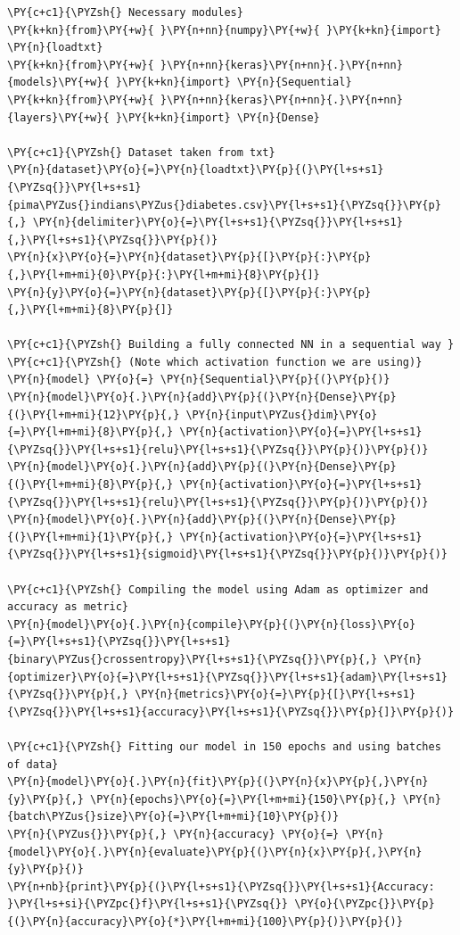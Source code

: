 \begin{Verbatim}[label=\makebox{\url{https://github.com/lucabaldini/cmepda/tree/master/slides/latex/snippets/pima_classifier.py}},commandchars=\\\{\}]
\PY{c+c1}{\PYZsh{} Necessary modules}
\PY{k+kn}{from}\PY{+w}{ }\PY{n+nn}{numpy}\PY{+w}{ }\PY{k+kn}{import} \PY{n}{loadtxt}
\PY{k+kn}{from}\PY{+w}{ }\PY{n+nn}{keras}\PY{n+nn}{.}\PY{n+nn}{models}\PY{+w}{ }\PY{k+kn}{import} \PY{n}{Sequential}
\PY{k+kn}{from}\PY{+w}{ }\PY{n+nn}{keras}\PY{n+nn}{.}\PY{n+nn}{layers}\PY{+w}{ }\PY{k+kn}{import} \PY{n}{Dense}

\PY{c+c1}{\PYZsh{} Dataset taken from txt}
\PY{n}{dataset}\PY{o}{=}\PY{n}{loadtxt}\PY{p}{(}\PY{l+s+s1}{\PYZsq{}}\PY{l+s+s1}{pima\PYZus{}indians\PYZus{}diabetes.csv}\PY{l+s+s1}{\PYZsq{}}\PY{p}{,} \PY{n}{delimiter}\PY{o}{=}\PY{l+s+s1}{\PYZsq{}}\PY{l+s+s1}{,}\PY{l+s+s1}{\PYZsq{}}\PY{p}{)}
\PY{n}{x}\PY{o}{=}\PY{n}{dataset}\PY{p}{[}\PY{p}{:}\PY{p}{,}\PY{l+m+mi}{0}\PY{p}{:}\PY{l+m+mi}{8}\PY{p}{]}
\PY{n}{y}\PY{o}{=}\PY{n}{dataset}\PY{p}{[}\PY{p}{:}\PY{p}{,}\PY{l+m+mi}{8}\PY{p}{]}

\PY{c+c1}{\PYZsh{} Building a fully connected NN in a sequential way }
\PY{c+c1}{\PYZsh{} (Note which activation function we are using)}
\PY{n}{model} \PY{o}{=} \PY{n}{Sequential}\PY{p}{(}\PY{p}{)}
\PY{n}{model}\PY{o}{.}\PY{n}{add}\PY{p}{(}\PY{n}{Dense}\PY{p}{(}\PY{l+m+mi}{12}\PY{p}{,} \PY{n}{input\PYZus{}dim}\PY{o}{=}\PY{l+m+mi}{8}\PY{p}{,} \PY{n}{activation}\PY{o}{=}\PY{l+s+s1}{\PYZsq{}}\PY{l+s+s1}{relu}\PY{l+s+s1}{\PYZsq{}}\PY{p}{)}\PY{p}{)}
\PY{n}{model}\PY{o}{.}\PY{n}{add}\PY{p}{(}\PY{n}{Dense}\PY{p}{(}\PY{l+m+mi}{8}\PY{p}{,} \PY{n}{activation}\PY{o}{=}\PY{l+s+s1}{\PYZsq{}}\PY{l+s+s1}{relu}\PY{l+s+s1}{\PYZsq{}}\PY{p}{)}\PY{p}{)}
\PY{n}{model}\PY{o}{.}\PY{n}{add}\PY{p}{(}\PY{n}{Dense}\PY{p}{(}\PY{l+m+mi}{1}\PY{p}{,} \PY{n}{activation}\PY{o}{=}\PY{l+s+s1}{\PYZsq{}}\PY{l+s+s1}{sigmoid}\PY{l+s+s1}{\PYZsq{}}\PY{p}{)}\PY{p}{)}

\PY{c+c1}{\PYZsh{} Compiling the model using Adam as optimizer and accuracy as metric}
\PY{n}{model}\PY{o}{.}\PY{n}{compile}\PY{p}{(}\PY{n}{loss}\PY{o}{=}\PY{l+s+s1}{\PYZsq{}}\PY{l+s+s1}{binary\PYZus{}crossentropy}\PY{l+s+s1}{\PYZsq{}}\PY{p}{,} \PY{n}{optimizer}\PY{o}{=}\PY{l+s+s1}{\PYZsq{}}\PY{l+s+s1}{adam}\PY{l+s+s1}{\PYZsq{}}\PY{p}{,} \PY{n}{metrics}\PY{o}{=}\PY{p}{[}\PY{l+s+s1}{\PYZsq{}}\PY{l+s+s1}{accuracy}\PY{l+s+s1}{\PYZsq{}}\PY{p}{]}\PY{p}{)}

\PY{c+c1}{\PYZsh{} Fitting our model in 150 epochs and using batches of data}
\PY{n}{model}\PY{o}{.}\PY{n}{fit}\PY{p}{(}\PY{n}{x}\PY{p}{,}\PY{n}{y}\PY{p}{,} \PY{n}{epochs}\PY{o}{=}\PY{l+m+mi}{150}\PY{p}{,} \PY{n}{batch\PYZus{}size}\PY{o}{=}\PY{l+m+mi}{10}\PY{p}{)}
\PY{n}{\PYZus{}}\PY{p}{,} \PY{n}{accuracy} \PY{o}{=} \PY{n}{model}\PY{o}{.}\PY{n}{evaluate}\PY{p}{(}\PY{n}{x}\PY{p}{,}\PY{n}{y}\PY{p}{)}
\PY{n+nb}{print}\PY{p}{(}\PY{l+s+s1}{\PYZsq{}}\PY{l+s+s1}{Accuracy: }\PY{l+s+si}{\PYZpc{}f}\PY{l+s+s1}{\PYZsq{}} \PY{o}{\PYZpc{}}\PY{p}{(}\PY{n}{accuracy}\PY{o}{*}\PY{l+m+mi}{100}\PY{p}{)}\PY{p}{)}

\end{Verbatim}

